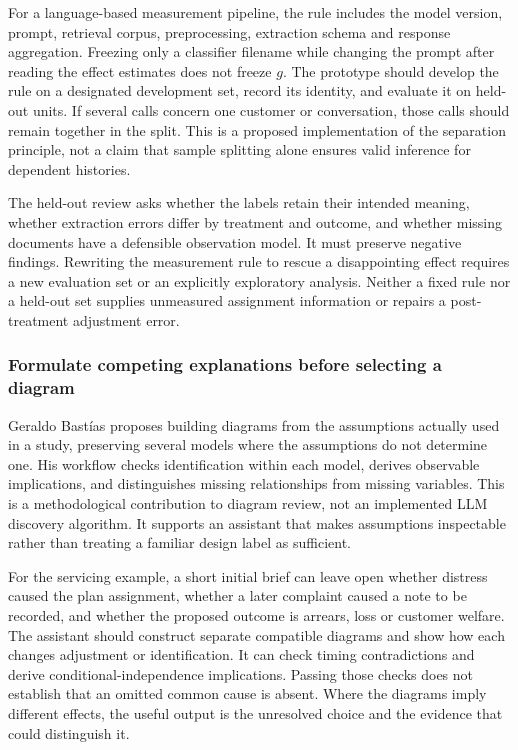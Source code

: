 For a language-based measurement pipeline, the rule includes the model
version, prompt, retrieval corpus, preprocessing, extraction schema and
response aggregation. Freezing only a classifier filename while changing
the prompt after reading the effect estimates does not freeze \(g\). The
prototype should develop the rule on a designated development set,
record its identity, and evaluate it on held-out units. If several calls
concern one customer or conversation, those calls should remain together
in the split. This is a proposed implementation of the separation
principle, not a claim that sample splitting alone ensures valid
inference for dependent histories.

The held-out review asks whether the labels retain their intended
meaning, whether extraction errors differ by treatment and outcome, and
whether missing documents have a defensible observation model. It must
preserve negative findings. Rewriting the measurement rule to rescue a
disappointing effect requires a new evaluation set or an explicitly
exploratory analysis. Neither a fixed rule nor a held-out set supplies
unmeasured assignment information or repairs a post-treatment adjustment
error.

\hypertarget{formulate-competing-explanations-before-selecting-a-diagram}{%
\subsubsection{Formulate competing explanations before selecting a
diagram}\label{formulate-competing-explanations-before-selecting-a-diagram}}

Geraldo Bastías proposes building diagrams from the assumptions actually
used in a study, preserving several models where the assumptions do not
determine one. His workflow checks identification within each model,
derives observable implications, and distinguishes missing relationships
from missing variables. This is a methodological contribution to diagram
review, not an implemented LLM discovery algorithm. It supports an
assistant that makes assumptions inspectable rather than treating a
familiar design label as sufficient. \cite{exec13_census_credible}

For the servicing example, a short initial brief can leave open whether
distress caused the plan assignment, whether a later complaint caused a
note to be recorded, and whether the proposed outcome is arrears, loss
or customer welfare. The assistant should construct separate compatible
diagrams and show how each changes adjustment or identification. It can
check timing contradictions and derive conditional-independence
implications. Passing those checks does not establish that an omitted
common cause is absent. Where the diagrams imply different effects, the
useful output is the unresolved choice and the evidence that could
distinguish it.

